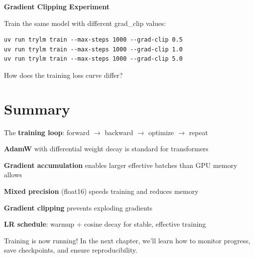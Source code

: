 \begin{exercise}
\textbf{Gradient Clipping Experiment}

Train the same model with different grad\_clip values:
\begin{lstlisting}[style=shell, numbers=none]
uv run trylm train --max-steps 1000 --grad-clip 0.5
uv run trylm train --max-steps 1000 --grad-clip 1.0
uv run trylm train --max-steps 1000 --grad-clip 5.0
\end{lstlisting}

How does the training loss curve differ?
\end{exercise}

\section{Summary}

\begin{summary}
    \item The \textbf{training loop}: forward $\to$ backward $\to$ optimize $\to$ repeat
    \item \textbf{AdamW} with differential weight decay is standard for transformers
    \item \textbf{Gradient accumulation} enables larger effective batches than GPU memory allows
    \item \textbf{Mixed precision} (float16) speeds training and reduces memory
    \item \textbf{Gradient clipping} prevents exploding gradients
    \item \textbf{LR schedule}: warmup + cosine decay for stable, effective training
\end{summary}

Training is now running! In the next chapter, we'll learn how to monitor progress, save checkpoints, and ensure reproducibility.
